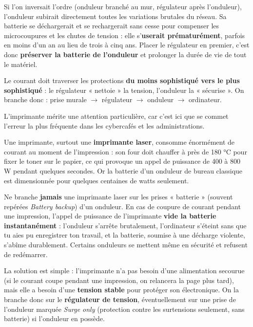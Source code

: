 \documentclass[11pt]{article}
\newcounter{popsec}
\newcounter{popsub}
\newcommand{\courssub}[1]{%
  \stepcounter{popsub}%
  \par\vspace{9pt}\noindent{\popxbold\fontsize{11.5}{13}\selectfont\color{popink}{\color{poporange}\thepopsec.\thepopsub}\hspace{6pt}#1}\par\nopagebreak\vspace{4pt}
}
\begin{document}
Si l'on inversait l'ordre (onduleur branché au mur, régulateur après l'onduleur), l'onduleur subirait directement toutes les variations brutales du réseau. Sa batterie se déchargerait et se rechargerait sans cesse pour compenser les microcoupures et les chutes de tension : elle s'\textbf{userait prématurément}, parfois en moins d'un an au lieu de trois à cinq ans. Placer le régulateur en premier, c'est donc \textbf{préserver la batterie de l'onduleur} et prolonger la durée de vie de tout le matériel.

\begin{aretenir}[La règle d'or]
Le courant doit traverser les protections \textbf{du moins sophistiqué vers le plus sophistiqué} : le régulateur « nettoie » la tension, l'onduleur la « sécurise ». On branche donc : prise murale $\rightarrow$ régulateur $\rightarrow$ onduleur $\rightarrow$ ordinateur.
\end{aretenir}

\courssub{Le cas particulier de l'imprimante}

L'imprimante mérite une attention particulière, car c'est ici que se commet l'erreur la plus fréquente dans les cybercafés et les administrations.

Une imprimante, surtout une \textbf{imprimante laser}, consomme énormément de courant au moment de l'impression : son four doit chauffer à près de 180 °C pour fixer le toner sur le papier, ce qui provoque un appel de puissance de 400 à 800 W pendant quelques secondes. Or la batterie d'un onduleur de bureau classique est dimensionnée pour quelques centaines de watts seulement.

\begin{attention}
Ne branche \textbf{jamais} une imprimante laser sur les prises « batterie » (souvent repérées \emph{Battery backup}) d'un onduleur. En cas de coupure de courant pendant une impression, l'appel de puissance de l'imprimante \textbf{vide la batterie instantanément} : l'onduleur s'arrête brutalement, l'ordinateur s'éteint sans que tu aies pu enregistrer ton travail, et la batterie, soumise à une décharge violente, s'abîme durablement. Certains onduleurs se mettent même en sécurité et refusent de redémarrer.
\end{attention}

La solution est simple : l'imprimante n'a pas besoin d'une alimentation secourue (si le courant coupe pendant une impression, on relancera la page plus tard), mais elle a besoin d'une \textbf{tension stable} pour protéger son électronique. On la branche donc sur le \textbf{régulateur de tension}, éventuellement sur une prise de l'onduleur marquée \emph{Surge only} (protection contre les surtensions seulement, sans batterie) si l'onduleur en possède.
\end{document}
